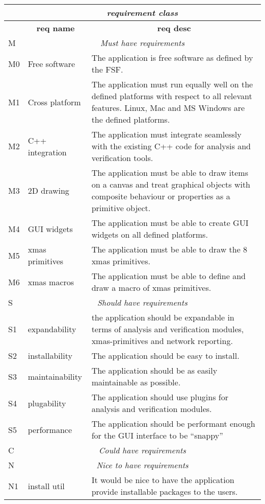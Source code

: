 \begin{center}
    \small\sf
    \begin{tabular}{|l|p{7em}|p{23em}|}
	\hline
	        & \multicolumn{2}{c|}{\sf\em\large requirement class}\\\hline
	{}      & \multicolumn{1}{c|}{\bf req name} & \multicolumn{1}{c|}{\bf req desc}\\\hline
	M	& \multicolumn{2}{c|}{\sf\emph{\large Must have requirements}}
		\\\hline
	M0	& Free software  & The application is free software as defined by the FSF.
		\\\hline
	M1	& Cross platform & The application must run equally well on the
				    defined platforms with respect to all relevant features.
				    Linux, Mac and MS Windows are the defined platforms.
		\\\hline
	M2	& C++ integration & The application must integrate seamlessly with
				the existing C++ code for analysis and verification tools.
		\\\hline
	M3	& 2D drawing & The application must be able to draw items on a
				canvas and treat graphical objects with composite
				behaviour or properties as a primitive object.
		\\\hline
	M4	& GUI widgets & The application must be able to create GUI widgets
				on all defined platforms.
		\\\hline
	M5      & xmas primitives & The application must be able to draw the 8 xmas
				    primitives.
		\\\hline
	M6	& xmas macros     & The application must be able to define and draw
				    a macro of xmas primitives.
		\\\hline
	S	& \multicolumn{2}{c|}{\sf\emph{\large Should have requirements}}
		\\\hline
	S1	& expandability & the application should be expandable in terms of
				analysis and verification modules, xmas-primitives and
				network reporting.
		\\\hline
	S2	& installability & The application should be easy to install.
		\\\hline
	S3	& maintainability & The application should be as easily maintainable as possible.
		\\\hline
	S4	& plugability	& The application should use plugins for analysis and
				verification modules.
		\\\hline
	S5	& performance	& The application should be performant enough for the GUI
				    interface to be ``snappy''
		\\\hline
	C	& \multicolumn{2}{c|}{\sf\emph{\large Could have requirements}}
		\\\hline
	N	& \multicolumn{2}{c|}{\sf\emph{\large Nice to have requirements}}
		\\\hline
	N1	& install util	& It would be nice to have the application provide
				installable packages to the users.
		\\\hline
    \end{tabular}
    \label{tab: appl-requirements}
\end{center}

